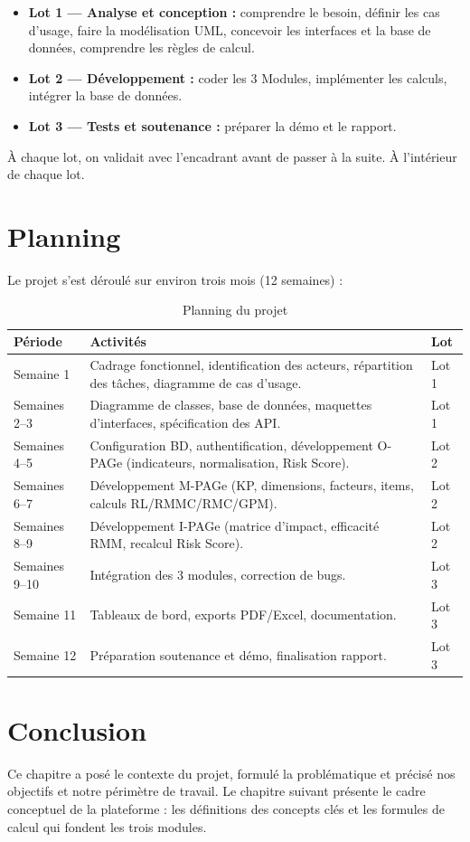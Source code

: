 \begin{itemize}
    \item \textbf{Lot 1 --- Analyse et conception :} comprendre le besoin, définir les cas d'usage, faire la modélisation UML, concevoir les interfaces et la base de données, comprendre les règles de calcul.
    \item \textbf{Lot 2 --- Développement :} coder les 3 Modules, implémenter les calculs, intégrer la base de données.
    \item \textbf{Lot 3 --- Tests et soutenance :} préparer la démo et le rapport.
\end{itemize}

À chaque lot, on validait avec l'encadrant avant de passer à la suite. À l'intérieur de chaque lot.
\section{Planning}
Le projet s'est déroulé sur environ trois mois (12 semaines) :

\begin{table}[h]
\centering
\renewcommand{\arraystretch}{1.3}
\begin{tabular}{@{}p{}p{}p{}@{}}
\hline
\textbf{Période} & \textbf{Activités} & \textbf{Lot} \\
\hline
Semaine 1 & Cadrage fonctionnel, identification des acteurs, répartition des tâches, diagramme de cas d'usage. & Lot 1 \\
\hline
Semaines 2--3 & Diagramme de classes, base de données, maquettes d'interfaces, spécification des API. & Lot 1 \\
\hline
Semaines 4--5 & Configuration BD, authentification, développement O-PAGe (indicateurs, normalisation, Risk Score). & Lot 2 \\
\hline
Semaines 6--7 & Développement M-PAGe (KP, dimensions, facteurs, items, calculs RL/RMMC/RMC/GPM). & Lot 2 \\
\hline
Semaines 8--9 & Développement I-PAGe (matrice d'impact, efficacité RMM, recalcul Risk Score). & Lot 2 \\
\hline
Semaines 9--10 & Intégration des 3 modules, correction de bugs. & Lot 3 \\
\hline
Semaine 11 & Tableaux de bord, exports PDF/Excel, documentation. & Lot 3 \\
\hline
Semaine 12 & Préparation soutenance et démo, finalisation rapport. & Lot 3 \\
\hline
\end{tabular}
\caption{Planning du projet}
\end{table}
\vspace{10cm}
\section{Conclusion}
Ce chapitre a posé le contexte du projet, formulé la problématique et précisé nos objectifs et notre périmètre de travail. Le chapitre suivant présente le cadre conceptuel de la plateforme : les définitions des concepts clés et les formules de calcul qui fondent les trois modules.